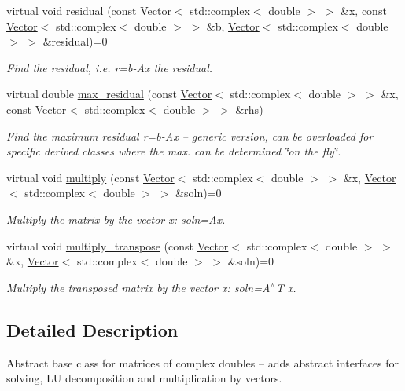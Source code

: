 \begin{DoxyCompactItemize}
virtual void \hyperlink{classoomph_1_1ComplexMatrixBase_aec72875402b9ba387e0724d6c2597430}{residual} (const \hyperlink{classoomph_1_1Vector}{Vector}$<$ std\+::complex$<$ double $>$ $>$ \&x, const \hyperlink{classoomph_1_1Vector}{Vector}$<$ std\+::complex$<$ double $>$ $>$ \&b, \hyperlink{classoomph_1_1Vector}{Vector}$<$ std\+::complex$<$ double $>$ $>$ \&residual)=0
\begin{DoxyCompactList}\small\item\em Find the residual, i.\+e. r=b-\/\+Ax the residual. \end{DoxyCompactList}\item 
virtual double \hyperlink{classoomph_1_1ComplexMatrixBase_ab5ad285a4cb503c9c962ff7e8d89857f}{max\+\_\+residual} (const \hyperlink{classoomph_1_1Vector}{Vector}$<$ std\+::complex$<$ double $>$ $>$ \&x, const \hyperlink{classoomph_1_1Vector}{Vector}$<$ std\+::complex$<$ double $>$ $>$ \&rhs)
\begin{DoxyCompactList}\small\item\em Find the maximum residual r=b-\/\+Ax -- generic version, can be overloaded for specific derived classes where the max. can be determined \char`\"{}on the fly\char`\"{}. \end{DoxyCompactList}\item 
virtual void \hyperlink{classoomph_1_1ComplexMatrixBase_a730c106643464a29ebf0660a6921ebaa}{multiply} (const \hyperlink{classoomph_1_1Vector}{Vector}$<$ std\+::complex$<$ double $>$ $>$ \&x, \hyperlink{classoomph_1_1Vector}{Vector}$<$ std\+::complex$<$ double $>$ $>$ \&soln)=0
\begin{DoxyCompactList}\small\item\em Multiply the matrix by the vector x\+: soln=Ax. \end{DoxyCompactList}\item 
virtual void \hyperlink{classoomph_1_1ComplexMatrixBase_a90c7832bad84aad3d0f437925efb089a}{multiply\+\_\+transpose} (const \hyperlink{classoomph_1_1Vector}{Vector}$<$ std\+::complex$<$ double $>$ $>$ \&x, \hyperlink{classoomph_1_1Vector}{Vector}$<$ std\+::complex$<$ double $>$ $>$ \&soln)=0
\begin{DoxyCompactList}\small\item\em Multiply the transposed matrix by the vector x\+: soln=A$^\wedge$T x. \end{DoxyCompactList}\end{DoxyCompactItemize}


\subsection{Detailed Description}
Abstract base class for matrices of complex doubles -- adds abstract interfaces for solving, LU decomposition and multiplication by vectors. 

